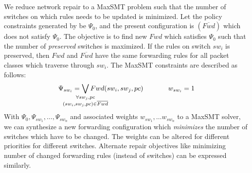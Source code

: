 We reduce network repair to a MaxSMT problem
such that 
the number of switches on which rules needs to be updated is minimized.
 Let
the policy constraints generated by \name be $\Psi_0$, and the present 
configuration is $(\overline{Fwd})$ which does not satisfy $\Psi_0$. The 
objective is to find new $Fwd$ which satisfies $\Psi_0$ such that the number of \emph{preserved} switches 
is maximized. If the rules on switch $sw_i$ is preserved, then $Fwd$ and $\overline{Fwd}$ have the same forwarding rules for all packet classes which
traverse through $sw_i$. The MaxSMT constraints are described as follows:
\begin{equation}
	\Psi_{sw_i} =  
	  \bigvee_{\mathclap{\substack{\forall sw_j, pc \\
			  		(sw_i, sw_j, pc) \in \overline{Fwd}}}} Fwd(sw_i, sw_j, pc) 
			~~~~~~~~~~~ 
			w_{sw_i}= 1
\end{equation}
With $\Psi_0, \Psi_{sw_1}, \ldots, \Psi_{sw_n}$  and associated weights 
$w_{sw_1}, \ldots w_{sw_n}$
to a MaxSMT solver, we can synthesize a new forwarding configuration 
which \emph{minimizes} the number of switches which have to be changed.
The weights can be altered for different priorities for different switches. Alternate
repair objectives like minimizing number of changed forwarding rules (instead of 
switches) can be expressed similarly.



 







 